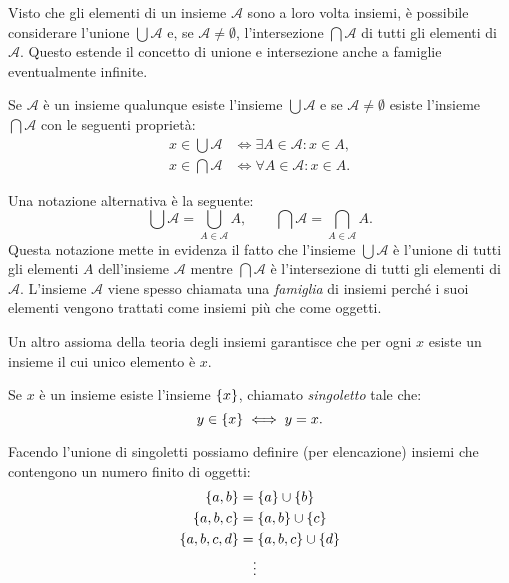 Visto che gli elementi di un insieme $\mathcal A$ sono a loro volta insiemi,
è possibile considerare l'unione $\bigcup \mathcal A$
e, se 
$\mathcal A \neq \emptyset$, l'intersezione $\bigcap \mathcal A$ di tutti gli elementi
di $\mathcal A$.
Questo estende il concetto di unione e intersezione anche a famiglie
eventualmente infinite.

\begin{axiom}
Se $\mathcal A$ è un insieme qualunque esiste l'insieme $\bigcup \mathcal A$
e se $\mathcal A \neq \emptyset$ esiste l'insieme $\bigcap \mathcal A$
con le seguenti proprietà:
\begin{align*}
  x \in \bigcup \mathcal A & \iff \exists A \in \mathcal A \colon x\in A, \\
  x \in \bigcap \mathcal A & \iff \forall A \in \mathcal A \colon x\in A.
\end{align*}
\end{axiom}
Una notazione alternativa è la seguente:
\[
 \bigcup \mathcal A = \bigcup_{A\in \mathcal A} A, \qquad 
 \bigcap \mathcal A = \bigcap_{A\in \mathcal A} A.  
\]
Questa notazione mette in evidenza il fatto che l'insieme 
$\bigcup \mathcal A$ è l'unione di tutti gli elementi $A$ dell'insieme 
$\mathcal A$ mentre $\bigcap \mathcal A$ è l'intersezione 
di tutti gli elementi di $\mathcal A$.
L'insieme $\mathcal A$ viene spesso chiamata una \emph{famiglia}
di insiemi perché i suoi elementi vengono trattati come insiemi 
più che come oggetti.

Un altro assioma della teoria degli insiemi garantisce che per ogni
$x$ esiste un insieme il cui unico elemento è $x$. 
\begin{axiom}[singoletto]
  Se $x$ è un insieme esiste l'insieme ${\left\{ x \right\}}$, 
  chiamato \emph{singoletto}%
%
  tale che:
  \[
    y \in {\left\{ x \right\}} \iff y=x.
  \]
\end{axiom}
Facendo l'unione di singoletti possiamo definire (per elencazione) insiemi che contengono
un numero finito di oggetti:
\begin{align*}
  {\left\{ a,b \right\}} &= {\left\{ a \right\}} \cup {\left\{ b \right\}} \\
  {\left\{ a, b, c \right\}} &= {\left\{ a,b \right\}} \cup {\left\{ c \right\}}\\
  {\left\{ a, b, c, d \right\}} &= {\left\{ a,b,c \right\}} \cup {\left\{ d \right\}}\\
  &\quad\vdots
\end{align*}

